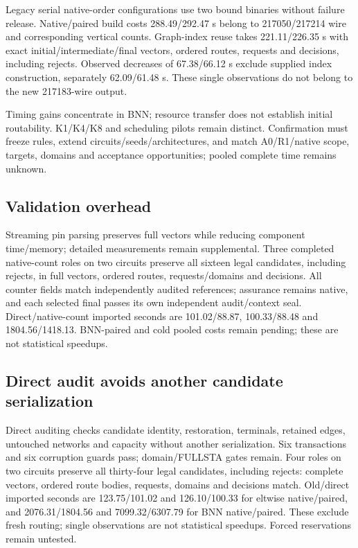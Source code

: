 \documentclass[conference,10pt]{IEEEtran}
\begin{document}
Legacy serial native-order configurations use two bound binaries without failure release. Native/paired build costs 288.49/292.47 s belong to 217050/217214 wire and corresponding vertical counts. Graph-index reuse takes 221.11/226.35 s with exact initial/intermediate/final vectors, ordered routes, requests and decisions, including rejects. Observed decreases of 67.38/66.12 s exclude supplied index construction, separately 62.09/61.48 s. These single observations do not belong to the new 217183-wire output.

Timing gains concentrate in BNN; resource transfer does not establish initial routability. K1/K4/K8 and scheduling pilots remain distinct. Confirmation must freeze rules, extend circuits/seeds/architectures, and match A0/R1/native scope, targets, domains and acceptance opportunities; pooled complete time remains unknown.

\subsection{Validation overhead}
Streaming pin parsing preserves full vectors while reducing component time/memory; detailed measurements remain supplemental. Three completed native-count roles on two circuits preserve all sixteen legal candidates, including rejects, in full vectors, ordered routes, requests/domains and decisions. All counter fields match independently audited references; assurance remains native, and each selected final passes its own independent audit/context seal. Direct/native-count imported seconds are 101.02/88.87, 100.33/88.48 and 1804.56/1418.13. BNN-paired and cold pooled costs remain pending; these are not statistical speedups.

\subsection{Direct audit avoids another candidate serialization}
Direct auditing checks candidate identity, restoration, terminals, retained edges, untouched networks and capacity without another serialization. Six transactions and six corruption guards pass; domain/FULLSTA gates remain. Four roles on two circuits preserve all thirty-four legal candidates, including rejects: complete vectors, ordered route bodies, requests, domains and decisions match. Old/direct imported seconds are 123.75/101.02 and 126.10/100.33 for eltwise native/paired, and 2076.31/1804.56 and 7099.32/6307.79 for BNN native/paired. These exclude fresh routing; single observations are not statistical speedups. Forced reservations remain untested.
\end{document}
